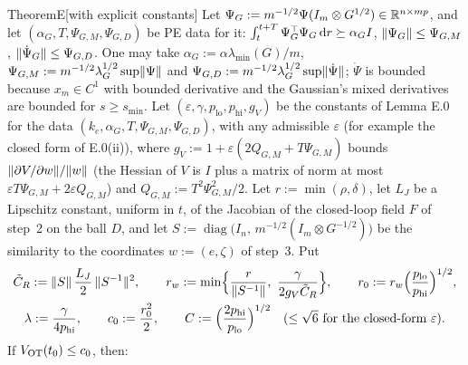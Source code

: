 
\begin{thm}{Theorem}{E}[with explicit constants]
Let $\Psi_G:=m^{-1/2}\Psi(I_m\otimes G^{1/2})\in\mathbb{R}^{n\times mp}$, and let $(\alpha_G,T,\Psi_{G,M},\Psi_{G,D})$ be PE
data for it: $\int_t^{t+T}\Psi_G^\top\Psi_G\,\mathrm{d} r\succeq\alpha_GI$, $\lVert \Psi_G\rVert\le\Psi_{G,M}$,
$\lVert \dot\Psi_G\rVert\le\Psi_{G,D}$. One may take $\alpha_G:=\alpha\lambda_{\min}(G)/m$,
$\Psi_{G,M}:=m^{-1/2}\lambda_G^{1/2}\sup\lVert \Psi\rVert$ and $\Psi_{G,D}:=m^{-1/2}\lambda_G^{1/2}\sup\lVert \dot\Psi\rVert$;
$\dot\Psi$ is bounded because $x_m\in C^1$ with bounded derivative and the Gaussian's mixed derivatives are bounded
for $s\ge s_{\min}$. Let $(\varepsilon,\gamma,p_{\mathrm{lo}},p_{\mathrm{hi}},g_V)$ be the constants of Lemma E.0 for
the data $(k_e,\alpha_G,T,\Psi_{G,M},\Psi_{G,D})$, with any admissible $\varepsilon$ (for example the closed form of
E.0(ii)), where $g_V:=1+\varepsilon(2Q_{G,M}+T\Psi_{G,M})$ bounds $\lVert \partial V/\partial w\rVert/\lVert w\rVert$ (the
Hessian of $V$ is $I$ plus a matrix of norm at most $\varepsilon T\Psi_{G,M}+2\varepsilon Q_{G,M}$) and
$Q_{G,M}:=T^2\Psi_{G,M}^2/2$. Let $r:=\min(\rho,\delta)$, let $L_J$ be a Lipschitz constant, uniform in $t$, of the Jacobian of the closed-loop field
$F$ of step~2 on the ball $D$, and let $S:=\operatorname{diag}\bigl(I_n,\,m^{-1/2}(I_m\otimes G^{-1/2})\bigr)$ be the
similarity to the coordinates $w:=(e,\zeta)$ of step~3. Put
\begin{gather*}
  \tilde C_R:=\lVert S\rVert\,\frac{L_J}{2}\,\lVert S^{-1}\rVert^2,\qquad
  r_w:=\min\Bigl\{\frac{r}{\lVert S^{-1}\rVert},\ \frac{\gamma}{2g_V\tilde C_R}\Bigr\},\qquad
  r_0:=r_w\Bigl(\frac{p_{\mathrm{lo}}}{p_{\mathrm{hi}}}\Bigr)^{1/2},\\
  \lambda:=\frac{\gamma}{4p_{\mathrm{hi}}},\qquad c_0:=\frac{r_0^2}{2},\qquad
  C:=\Bigl(\frac{2p_{\mathrm{hi}}}{p_{\mathrm{lo}}}\Bigr)^{1/2}\quad(\le\sqrt6\text{ for the closed-form }\varepsilon).
\end{gather*}
If $V_{\mathrm{OT}}(t_0)\le c_0$, then:
\begin{itemize}

\end{itemize}
\end{thm}
